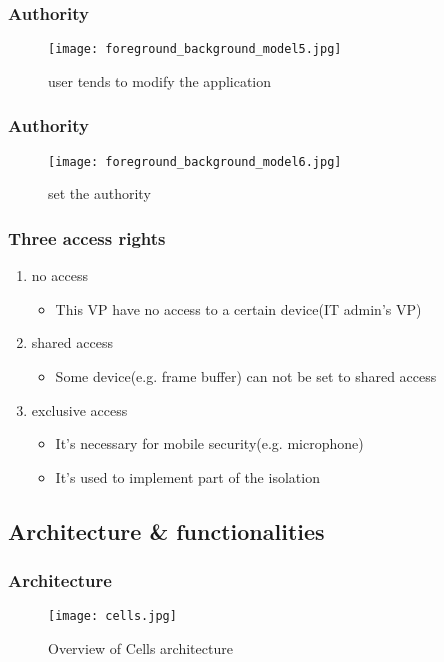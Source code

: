 \documentclass[utf8]{beamer}
\begin{document}
\begin{frame}
\frametitle{Authority}
\begin{figure}
\begin{center}
\texttt{[image: foreground\_background\_model5.jpg]}
\end{center}
\caption{user tends to modify the application}
\end{figure}
\end{frame}

\begin{frame}
\frametitle{Authority}
\begin{figure}
\begin{center}
\texttt{[image: foreground\_background\_model6.jpg]}
\end{center}
\caption{set the authority}
\end{figure}
\end{frame}

\begin{frame}
\frametitle{Three access rights}
\begin{enumerate}
\item<+-> no access
    \begin{itemize}
    \item<+> This VP have no access to a certain device(IT admin's VP)
    \end{itemize}
\item<+-> shared access
    \begin{itemize}
    \item<+> Some device(e.g. frame buffer) can not be set to shared access
    \end{itemize}
\item<+-> exclusive access
    \begin{itemize}
    \item<+-> It's necessary for mobile security(e.g. microphone)
    \item<+> It's used to implement part of the isolation
    \end{itemize}
\end{enumerate}
\end{frame}

\subsection{Architecture \& functionalities}
\begin{frame}
\frametitle{Architecture}
\begin{figure}
\begin{center}
\texttt{[image: cells.jpg]}
\end{center}
\caption{Overview of Cells architecture}
\end{figure}
\end{frame}
\end{document}
